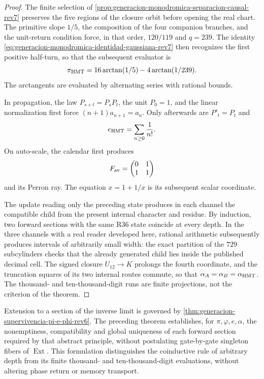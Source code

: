 \begin{proof}
The finite selection of
\cref{prop:generacion-monodromica-separacion-causal-rev7} preserves the five
regions of the closure orbit before opening the real chart. The primitive
slope \(1/5\), the composition of the four companion branches, and the
unit-return condition force, in that order, \(120/119\) and \(q=239\).
The identity
\eqref{eq:generacion-monodromica-identidad-gaussiana-rev7} then recognizes
the first positive half-turn, so that the subsequent evaluator is
\[
 \pi_{\rm HMT}
 =16\arctan(1/5)-4\arctan(1/239).
\]
The arctangents are evaluated by alternating series with rational bounds.

In propagation, the law \(P_{s+t}=P_sP_t\), the unit \(P_0=1\), and the
linear normalization first force \((n+1)a_{n+1}=a_n\). Only afterwards are
\(P'_t=P_t\) and
\[
 e_{\rm HMT}=\sum_{n\ge0}\frac1{n!}.
\]
On auto-scale, the calendar first produces
\[
 F_{\rm av}=\begin{pmatrix}0&1\\1&1\end{pmatrix}
\]
and its Perron ray. The equation \(x=1+1/x\) is its subsequent scalar
coordinate.

The update reading only the preceding state produces in each channel the
compatible child from the present internal character and residue. By
induction, two forward sections with the same R36 state coincide at every
depth. In the three channels with a real reader developed here, rational
arithmetic subsequently produces intervals of arbitrarily small
width: the exact partition of the \(729\) subcylinders checks that the already
generated child lies inside the published decimal cell. The signed closure
\(U_{12}\to K\) prolongs the fourth coordinate, and the truncation squares
of its two internal routes commute, so that
\(\alpha_A=\alpha_B=\alpha_{\rm HMT}\). The thousand- and ten-thousand-digit
runs are finite projections, not the criterion of the theorem.
\end{proof}

Extension to a section of the inverse limit is governed by
\cref{thm:generacion-supervivencia-pi-e-phi-rev6}. The preceding theorem
establishes, for \(\pi,\varphi,e,\alpha\), the nonemptiness, compatibility and
global uniqueness of each forward section required by that abstract
principle, without postulating gate-by-gate singleton fibers of
\(\operatorname{Ext}\). This formulation distinguishes the coinductive rule of
arbitrary depth from its finite thousand- and ten-thousand-digit evaluations,
without altering phase return or memory transport.

